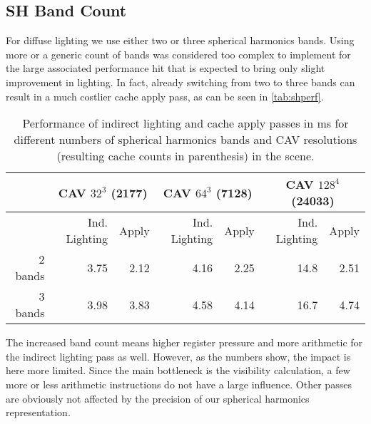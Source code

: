 \documentclass[thesis.tex]{subfiles}
\begin{document}
\subsection{SH Band Count} \label{sec:eva:shperf}
For diffuse lighting we use either two or three spherical harmonics bands.
Using more or a generic count of bands was considered too complex to implement for the large associated performance hit that is expected to bring only slight improvement in lighting.
In fact, already switching from two to three bands can result in a much costlier cache apply pass, as can be seen in \autoref{tab:shperf}.
\begin{table}[htbp]
  \centering
    \begin{tabular}{r|rr|rr|rr}
    \toprule
          & \multicolumn{2}{c|}{CAV $32^3$ (2177)} & \multicolumn{2}{c|}{CAV $64^3$ (7128)} & \multicolumn{2}{c}{CAV $128^4$ (24033)} \\
    \midrule
          & \small{Ind. Lighting} & Apply & Ind. Lighting & Apply & Ind. Lighting & Apply \\
    \midrule
    2 bands & 3.75  & 2.12  & 4.16  & 2.25  & 14.8  & 2.51 \\
    3 bands & 3.98  & 3.83  & 4.58  & 4.14  & 16.7  & 4.74 \\
    \bottomrule
    \end{tabular}
\caption{Performance of indirect lighting and cache apply passes in \si{\milli\second} for different numbers of spherical harmonics bands and CAV resolutions (resulting cache counts in parenthesis) in the  scene. }
\label{tab:shperf}
\end{table}
The increased band count means higher register pressure and more arithmetic for the indirect lighting pass as well.
However, as the numbers show, the impact is here more limited.
Since the main bottleneck is the visibility calculation, a few more or less arithmetic instructions do not have a large influence.
Other passes are obviously not affected by the precision of our spherical harmonics representation.
\end{document}
